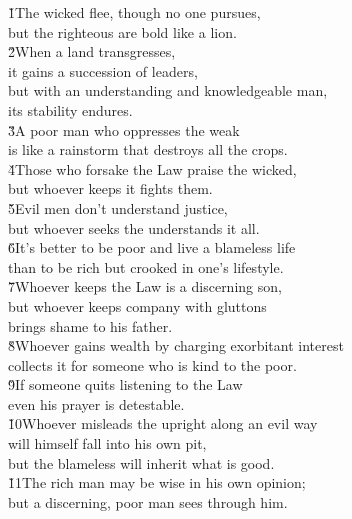 \begin{poetry}
\poeml {}
\v{1}The wicked flee, though no one pursues, \\
\poeml but the righteous are bold like a lion. \\
\poeml \v{2}When a land transgresses, \\
\poemll    it gains a succession of leaders, \\
\poeml but with an understanding and knowledgeable man, \\
\poemll    its stability endures. \\
\poeml \v{3}A poor man who oppresses the weak \\
\poemll    is like a rainstorm that destroys all the crops. \\
\poeml \v{4}Those who forsake the Law praise the wicked, \\
\poemll    but whoever keeps it fights them. \\
\poeml \v{5}Evil men don't understand justice, \\
\poemll    but whoever seeks the  understands it all. \\
\poeml \v{6}It's better to be poor and live a blameless life \\
\poemll    than to be rich but crooked in one's lifestyle. \\
\poeml \v{7}Whoever keeps the Law is a discerning son, \\
\poemll    but whoever keeps company with gluttons \\
\poemlll       brings shame to his father. \\
\poeml \v{8}Whoever gains wealth by charging exorbitant interest \\
\poemll    collects it for someone who is kind to the poor. \\
\poeml \v{9}If someone quits listening to the Law \\
\poemll    even his prayer is detestable. \\
\poeml \v{10}Whoever misleads the upright along an evil way \\
\poemll    will himself fall into his own pit, \\
\poemlll       but the blameless will inherit what is good. \\
\poeml \v{11}The rich man may be wise in his own opinion; \\
\poemll    but a discerning, poor man sees through him. \\

\end{poetry}

